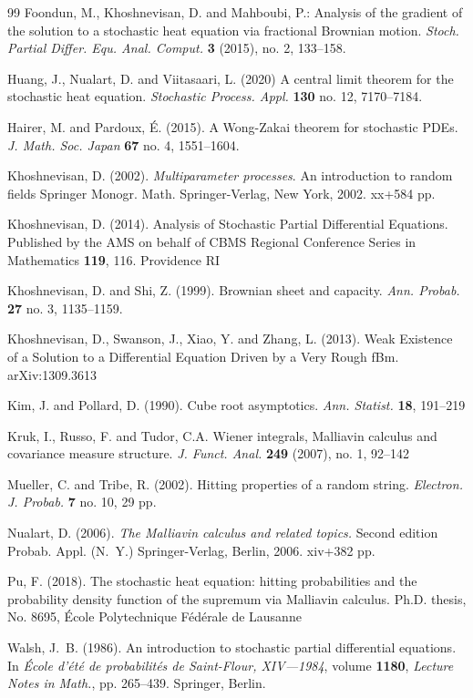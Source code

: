 \documentclass[12pt,a4paper]{article}
\newcommand{\<}{\langle}
\renewcommand{\>}{\rangle}
\begin{document}
\begin{thebibliography}{99}
 Foondun, M., Khoshnevisan, D. and Mahboubi, P.:
Analysis of the gradient of the solution to a stochastic heat equation via fractional Brownian motion.
{\it Stoch. Partial Differ. Equ. Anal. Comput.}   {\bf 3} (2015), no. 2, 133--158.


Huang, J.,  Nualart, D. and Viitasaari, L. (2020)
A central limit theorem for the stochastic heat equation.
{\it Stochastic Process. Appl.}   {\bf 130} no. 12, 7170–7184.


 Hairer, M. and Pardoux, \'E. (2015).
A Wong-Zakai theorem for stochastic PDEs. {\it J. Math. Soc. Japan}   {\bf 67}  no. 4, 1551--1604.

 Khoshnevisan, D.  (2002). {\it Multiparameter processes}.
An introduction to random fields
Springer Monogr. Math.
Springer-Verlag, New York, 2002. xx+584 pp.

 Khoshnevisan, D.  (2014). Analysis of Stochastic Partial Differential Equations. Published by the AMS on behalf of CBMS Regional Conference Series
in Mathematics \textbf{119}, 116. Providence RI

Khoshnevisan, D. and Shi, Z. (1999). Brownian sheet and capacity.
{\it Ann. Probab.} \textbf{27}  no. 3, 1135–1159.

Khoshnevisan, D.,  Swanson, J.,  Xiao, Y.  and Zhang, L. (2013). Weak Existence of a Solution to a Differential Equation Driven by a Very Rough fBm.  arXiv:1309.3613

 Kim, J. and Pollard, D. (1990). Cube root asymptotics. \textit{Ann. Statist.} \textbf{18}, 191--219 

 Kruk, I., Russo, F. and Tudor, C.A. Wiener integrals, Malliavin calculus and covariance measure structure.
{\it J. Funct. Anal.} \textbf{249} (2007), no. 1, 92--142

 Mueller, C. and Tribe, R. (2002). Hitting properties of a random string.
{\it Electron. J. Probab.} {\bf7}  no. 10, 29 pp.

Nualart, D. (2006).
{\it The Malliavin calculus and related topics.}
Second edition
Probab. Appl. (N.~Y.)
Springer-Verlag, Berlin, 2006. xiv+382 pp.


Pu, F. (2018). The stochastic heat equation: hitting probabilities and the probability density function of the supremum via Malliavin calculus. Ph.D. thesis, No. 8695,  \'{E}cole Polytechnique F\'{e}d\'{e}rale de Lausanne 

Walsh, J.~B. (1986).
\newblock An introduction to stochastic partial differential equations.
\newblock In {\em \'{E}cole d'\'et\'e de probabilit\'es de {S}aint-{F}lour,
  {XIV}---1984}, volume \textbf{1180}, {\em Lecture Notes in Math.}, pp. 265--439.
  Springer, Berlin.


 \end{thebibliography}
 
 
 
 
 
 
 
 
 
 
 
 
 
 
\end{document}
